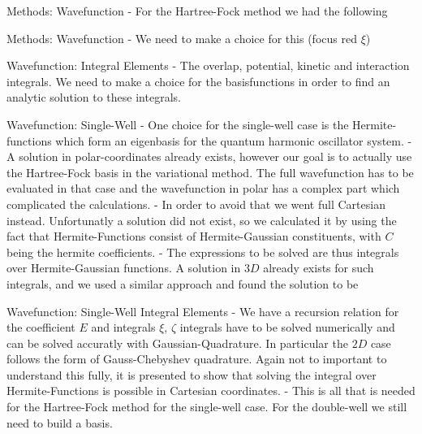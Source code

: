 \documentclass[10pt]{beamer}
\begin{document}
\begin{frame}[standout]{Methods: Wavefunction}
    - For the Hartree-Fock method we had the following
\end{frame}

\begin{frame}[standout]{Methods: Wavefunction}
    - We need to make a choice for this (focus red $\xi$)
\end{frame}

\begin{frame}[standout]{Wavefunction: Integral Elements}
    - The overlap, potential, kinetic and interaction integrals. We need to
    make a choice for the basisfunctions in order to find an analytic solution
    to these integrals.
\end{frame}

\begin{frame}[fragile]{Wavefunction: Single-Well}
    - One choice for the single-well case is the Hermite-functions which form
    an eigenbasis for the quantum harmonic oscillator system.
    - A solution in polar-coordinates already exists, however our goal is to
    actually use the Hartree-Fock basis in the variational method. The full
    wavefunction has to be evaluated in that case and the wavefunction in polar
    has a complex part which complicated the calculations.
    - In order to avoid that we went full Cartesian instead. Unfortunatly a
    solution did not exist, so we calculated it by using the fact that
    Hermite-Functions consist of Hermite-Gaussian constituents, with $C$ being the
    hermite coefficients.
    - The expressions to be solved are thus integrals over Hermite-Gaussian
    functions. A solution in $3D$ already exists for such integrals, and we
    used a similar approach and found the solution to be
\end{frame}

\begin{frame}[fragile]{Wavefunction: Single-Well Integral Elements}
    - We have a recursion relation for the coefficient $E$ and integrals $\xi$,
    $\zeta$ integrals have to be solved numerically and can be solved accuratly
    with Gaussian-Quadrature. In particular the $2D$ case follows the form of
    Gauss-Chebyshev quadrature. Again not to important to understand this
    fully, it is presented to show that solving the integral over
    Hermite-Functions is possible in Cartesian coordinates.
    - This is all that is needed for the Hartree-Fock method for the
    single-well case. For the double-well we still need to build a basis.
\end{frame}
\end{document}
